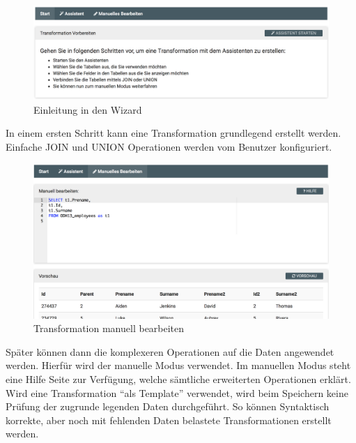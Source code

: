 \begin{figure}[H]
\centering
\includegraphics[width=\linewidth]{fig/wizard-step-one.png}
\caption{Einleitung in den Wizard}
\label{fig:pd:wizard-step-one}
\end{figure}
In einem ersten Schritt kann eine Transformation grundlegend erstellt werden. Einfache JOIN und UNION Operationen werden vom Benutzer konfiguriert.
\begin{figure}[H]
\centering
\includegraphics[width=\linewidth]{fig/wizard-manual.png}
\caption{Transformation manuell bearbeiten}
\label{fig:pd:wizard-manual}
\end{figure}

Später können dann die komplexeren Operationen auf die Daten angewendet werden. Hierfür wird der manuelle Modus verwendet. Im manuellen Modus steht eine Hilfe Seite zur Verfügung, welche sämtliche erweiterten Operationen erklärt.\\
Wird eine Transformation ``als Template'' verwendet, wird beim Speichern keine Prüfung der zugrunde legenden Daten durchgeführt. So können Syntaktisch korrekte, aber noch mit fehlenden Daten belastete Transformationen erstellt werden.

